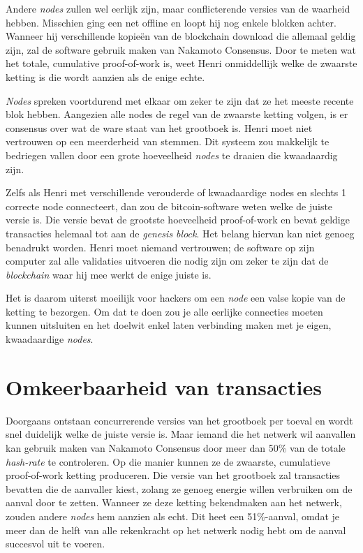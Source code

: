 Andere \textit{nodes} zullen wel eerlijk zijn, maar conflicterende versies van de waarheid hebben. Misschien ging een net offline en loopt hij nog enkele blokken achter. Wanneer hij verschillende kopieën van de blockchain download die allemaal geldig zijn, zal de software gebruik maken van Nakamoto Consensus. Door te meten wat het totale, cumulative proof-of-work is, weet Henri onmiddellijk welke de zwaarste ketting is die wordt aanzien als de enige echte.

\textit{Nodes} spreken voortdurend met elkaar om zeker te zijn dat ze het meeste recente blok hebben. Aangezien alle nodes de regel van de zwaarste ketting volgen, is er consensus over wat de ware staat van het grootboek is. Henri moet niet vertrouwen op een meerderheid van stemmen. Dit systeem zou makkelijk te bedriegen vallen door een grote hoeveelheid \textit{nodes} te draaien die kwaadaardig zijn.

Zelfs als Henri met verschillende verouderde of kwaadaardige nodes en slechts 1 correcte node connecteert, dan zou de bitcoin-software weten welke de juiste versie is. Die versie bevat de grootste hoeveelheid proof-of-work en bevat geldige transacties helemaal tot aan de \textit{genesis block}. Het belang hiervan kan niet genoeg benadrukt worden. Henri moet niemand vertrouwen; de software op zijn computer zal alle validaties uitvoeren die nodig zijn om zeker te zijn dat de \textit{blockchain} waar hij mee werkt de enige juiste is.

Het is daarom uiterst moeilijk voor hackers om een \textit{node} een valse kopie van de ketting te bezorgen. Om dat te doen zou je alle eerlijke connecties moeten kunnen uitsluiten en het doelwit enkel laten verbinding maken met je eigen, kwaadaardige \textit{nodes}.

\section{Omkeerbaarheid van transacties}
Doorgaans ontstaan concurrerende versies van het grootboek per toeval en wordt snel duidelijk welke de juiste versie is. Maar iemand die het netwerk wil aanvallen kan gebruik maken van Nakamoto Consensus door meer dan 50\% van de totale \textit{hash-rate} te controleren. Op die manier kunnen ze de zwaarste, cumulatieve proof-of-work ketting produceren. Die versie van het grootboek zal transacties bevatten die de aanvaller kiest, zolang ze genoeg energie willen verbruiken om de aanval door te zetten. Wanneer ze deze ketting bekendmaken aan het netwerk, zouden andere \textit{nodes} hem aanzien als echt. Dit heet een 51\%-aanval, omdat je meer dan de helft van alle rekenkracht op het netwerk nodig hebt om de aanval succesvol uit te voeren.

